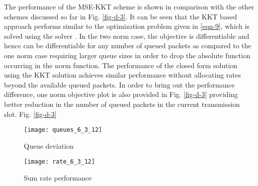 The performance of the \ac{MSE}-\ac{KKT} scheme is shown in comparison with the other schemes discussed so far in Fig. \ref{fig-d-3}. It can be seen that the \ac{KKT} based approach performs similar to the optimization problem given in \eqref{eqn-9}, which is solved using the solver \cite{grant2008cvx}. In the two norm case, the objective is differentiable and hence can be differentiable for any number of queued packets as compared to the one norm case requiring larger queue sizes in order to drop the absolute function occurring in the norm function. The performance of the closed form solution using the \ac{KKT} solution achieves similar performance without allocating rates beyond the available queued packets. In order to bring out the performance difference, one norm objective plot is also provided in Fig. \ref{fig-d-3} providing better reduction in the number of queued packets in the current transmission slot.
Fig. \ref{fig-d-3}
\begin{figure*}
\centering
\begin{subfigure}{0.49\textwidth}
\texttt{[image: queues\_6\_3\_12]}
\caption{Queue deviation}
\end{subfigure}
\hfill
\begin{subfigure}{0.49\textwidth}
\texttt{[image: rate\_6\_3\_12]}
\caption{Sum rate performance}
\end{subfigure}
\caption{Convergence plot for  model}
\label{fig-d-3}
\end{figure*}
